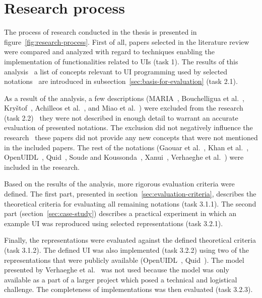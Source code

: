 \section{Research process}\label{sec:research-process}

The process of research conducted in the thesis is presented in figure~\ref{fig:research-process}.
First of all, papers selected in the literature review were compared and analyzed with regard to techniques enabling the implementation of functionalities related to UIs (task 1).
The results of this analysis \textendash\ a list of concepts relevant to UI programming used by selected notations \textendash\ are introduced in subsection~\ref{sec:basis-for-evaluation} (task 2.1).

As a result of the analysis, a few descriptions (MARIA~\cite{Paterno2009, MariaPDF}, Bouchelligua et al.~\cite{Bouchelligua2010}, Kryštof~\cite{kryvstof2010lpgm}, Achilleos et al.~\cite{Achilleos2011}, and Miao et al.~\cite{Miao2017}) were excluded from the research (task 2.2) \textendash\ they were not described in enough detail to warrant an accurate evaluation of presented notations.
The exclusion did not negatively influence the research \textendash\ these papers did not provide any new concepts that were not mentioned in the included papers.
The rest of the notations (Gaouar et al.~\cite{Gaouar2018}, Khan et al.~\cite{Khan2021}, OpenUIDL~\cite{Moldovan2020}, Quid~\cite{molina2018quid, Molina2019}, Soude and Koussonda~\cite{Soude2022}, Xanui~\cite{hermida2016xanui}, Verhaeghe et al.~\cite{Verhaeghe2021visual, Verhaeghe2021behavior}) were included in the research.

Based on the results of the analysis, more rigorous evaluation criteria were defined.
The first part, presented in section~\ref{sec:evaluation-criteria}, describes the theoretical criteria for evaluating all remaining notations (task 3.1.1).
The second part (section~\ref{sec:case-study}) describes a practical experiment in which an example UI was reproduced using selected representations (task 3.2.1).

Finally, the representations were evaluated against the defined theoretical criteria (task 3.1.2).
The defined UI was also implemented (task 3.2.2) using two of the representations that were publicly available (OpenUIDL~\cite{Moldovan2020}, Quid~\cite{molina2018quid, Molina2019}).
The model presented by Verhaeghe et al.~\cite{Verhaeghe2021visual, Verhaeghe2021behavior} was not used because the model was only available as a part of a larger project which posed a technical and logistical challenge.
The completeness of implementations was then evaluated (task 3.2.3).

